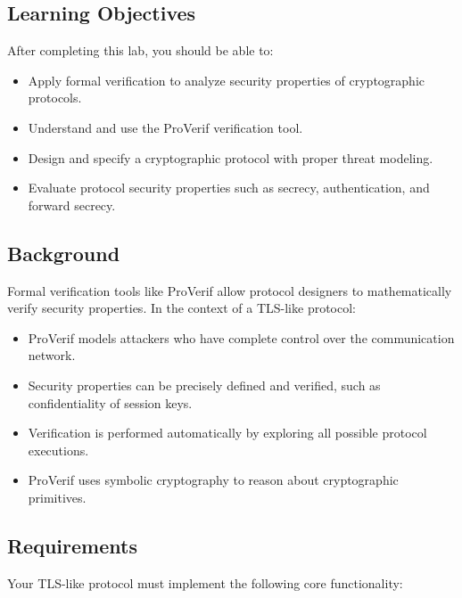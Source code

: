\documentclass[10pt,a4paper,american]{article}
\begin{document}
\subsection*{Learning Objectives}
After completing this lab, you should be able to:
\begin{itemize}
	\item Apply formal verification to analyze security properties of cryptographic protocols.
	\item Understand and use the ProVerif verification tool.
	\item Design and specify a cryptographic protocol with proper threat modeling.
	\item Evaluate protocol security properties such as secrecy, authentication, and forward secrecy.
\end{itemize}

\subsection*{Background}
Formal verification tools like ProVerif allow protocol designers to mathematically verify security properties. In the context of a TLS-like protocol:
\begin{itemize}
	\item ProVerif models attackers who have complete control over the communication network.
	\item Security properties can be precisely defined and verified, such as confidentiality of session keys.
	\item Verification is performed automatically by exploring all possible protocol executions.
	\item ProVerif uses symbolic cryptography to reason about cryptographic primitives.
\end{itemize}

\subsection*{Requirements}
Your TLS-like protocol must implement the following core functionality:
\end{document}
